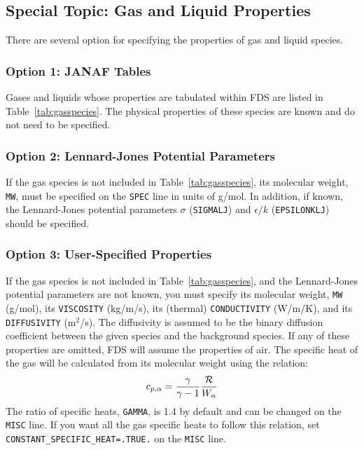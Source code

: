 \documentclass[11pt]{book}
\newcommand{\ct}{\tt\small}
\newcommand{\be}{\begin{equation}}
\newcommand{\ee}{\end{equation}}
\begin{document}
\subsection{Special Topic: Gas and Liquid Properties}

\label{gas_species_props}

There are several option for specifying the properties of gas and liquid species.

\subsubsection{Option 1: JANAF Tables}

Gases and liquids whose properties are tabulated within FDS are listed in
Table~\ref{tab:gasspecies}. The physical properties
of these species are known and do not need to be specified.

\subsubsection{Option 2: Lennard-Jones Potential Parameters}

If the gas species is not included in Table~\ref{tab:gasspecies}, its
molecular weight, {\ct MW}, must be specified on the {\ct SPEC} line in units of g/mol.
In addition, if known, the Lennard-Jones potential parameters $\sigma$ ({\ct SIGMALJ}) and
$\epsilon/k$ ({\ct EPSILONKLJ}) should be specified.

\subsubsection{Option 3: User-Specified Properties}

If the gas species is not included in Table~\ref{tab:gasspecies}, and the Lennard-Jones potential parameters are not known, you must specify
its molecular weight, {\ct MW} (g/mol),
its {\ct VISCOSITY} (kg/m/s), its (thermal) {\ct CONDUCTIVITY} (W/m/K), and its
{\ct DIFFUSIVITY} (m$^2$/s). The diffusivity is assumed to be the binary diffusion coefficient between the given species
and the background species. If any of these properties are omitted, FDS will assume the properties of air.
The specific heat of the gas will be calculated from its molecular weight using the relation:
\be c_{p,\alpha} = \frac{\gamma}{\gamma-1} \frac{\cal R}{W_\alpha} \ee
The ratio of specific heats, {\ct GAMMA}, is 1.4 by default and can be changed on the {\ct MISC} line. If you want all the gas specific heats to
follow this relation,
set {\ct CONSTANT\_SPECIFIC\_HEAT=.TRUE.} on the {\ct MISC} line.
\end{document}
